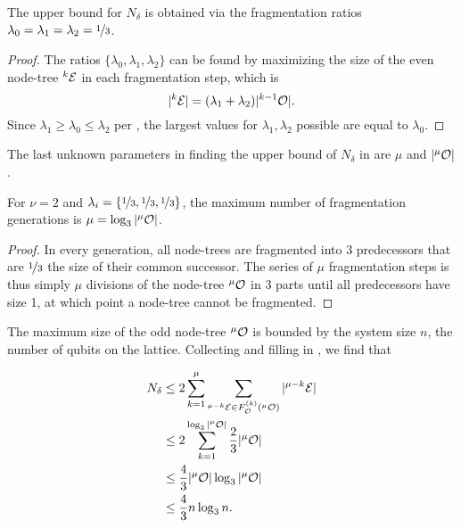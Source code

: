 \begin{theorem}\label{the:ratios}
  The upper bound for $N_\delta$ is obtained via the fragmentation ratios $\lambda_0 = \lambda_1 = \lambda_2 = \nicefrac{1}{3}$.
\end{theorem}
\begin{proof}
  The ratios $\{\lambda_0, \lambda_1, \lambda_2\}$ can be found by maximizing the size of the even node-tree ${}^{k}\mathcal{E}$ in each fragmentation step, which is 
  \begin{equation*}
    \lvert{}^{k}\mathcal{E}\rvert = (\lambda_1 + \lambda_2)\lvert{}^{k-1}\mathcal{O}\rvert.
  \end{equation*}
  Since $ \lambda_1 \geq \lambda_0 \leq \lambda_2$ per , the largest values for $\lambda_1, \lambda_2$ possible are equal to $\lambda_0$.
\end{proof}

The last unknown parameters in finding the upper bound of $N_\delta$ in are $\mu$ and $\lvert{}^{\mu}\mathcal{O}\rvert$.

\begin{theorem}\label{the:km}
  For $\nu = 2$ and $\lambda_i = \{\nicefrac{1}{3},\nicefrac{1}{3},\nicefrac{1}{3}\}$, the maximum number of fragmentation generations is $\mu = \log_3{\lvert{}^{\mu}\mathcal{O}\rvert}$.
\end{theorem}
\begin{proof}
  In every generation, all node-trees are fragmented into 3 predecessors that are $\nicefrac{1}{3}$ the size of their common successor. The series of $\mu$ fragmentation steps is thus simply $\mu$ divisions of the node-tree ${}^{\mu}\mathcal{O}$ in 3 parts until all predecessors have size 1, at which point a node-tree cannot be fragmented.
\end{proof}

The maximum size of the odd node-tree ${}^{\mu}\mathcal{O}$ is bounded by the system size $n$, the number of qubits on the lattice. Collecting  and filling in , we find that

\begin{align*}
  \nonumber N_\delta &\leq 2\sum_{k=1}^\mu{ \sum_{  {}^{\mu-k} \mathcal{E}\in F_{\mathcal{O}}^{(k)}( {}^{\mu} \mathcal{O}) }{ \lvert {}^{\mu-k} \mathcal{E}\rvert}  } \\
  \nonumber         &\leq 2\sum_{k=1}^{\log_3{\lvert{}^{\mu}\mathcal{O}\rvert}} \frac{2}{3}\lvert{}^{\mu}\mathcal{O}\rvert\\
                    &\leq \frac{4}{3}\lvert{}^{\mu}\mathcal{O}\rvert\log_3{\lvert{}^{\mu}\mathcal{O}\rvert} \\
                    &\leq \frac{4}{3}n \log_3{n}.
\end{align*}

